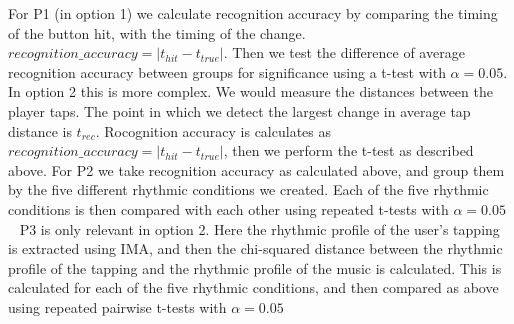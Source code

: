 For P1 (in option 1) we calculate recognition accuracy by comparing the timing of the button hit, with the timing of the change. $recognition\_accuracy = |t_{hit}-t_{true}|$. Then we test the difference of average recognition accuracy between groups for significance using a t-test with $\alpha=0.05$. In option 2 this is more complex. We would measure the distances between the player taps. The point in which we detect the largest change in average tap distance is $t_{rec}$. Rocognition accuracy is calculates as $recognition\_accuracy = |t_{hit}-t_{true}|$, then we perform the t-test as described above. 
For P2 we take recognition accuracy as calculated above, and group them by the five different rhythmic conditions we created. Each of the five rhythmic conditions is then compared with each other using repeated t-tests with $\alpha=0.05$\\  
P3 is only relevant in option 2. Here the rhythmic profile of the user's tapping is extracted using IMA, and then the chi-squared distance between the rhythmic profile of the tapping and the rhythmic profile of the music is calculated. This is calculated for each of the five rhythmic conditions, and then compared as above using repeated pairwise t-tests with $\alpha=0.05$

